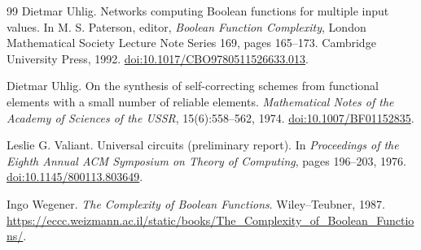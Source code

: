 \documentclass[11pt]{article}
\theoremstyle{definition}
\begin{document}
\begin{thebibliography}{99}
Dietmar Uhlig.
\newblock Networks computing Boolean functions for multiple input values.
\newblock In M. S. Paterson, editor, \emph{Boolean Function Complexity},
London Mathematical Society Lecture Note Series 169, pages 165--173.
Cambridge University Press, 1992.
\newblock \href{https://doi.org/10.1017/CBO9780511526633.013}{doi:10.1017/CBO9780511526633.013}.

Dietmar Uhlig.
\newblock On the synthesis of self-correcting schemes from functional
elements with a small number of reliable elements.
\newblock \emph{Mathematical Notes of the Academy of Sciences of the USSR},
15(6):558--562, 1974.
\newblock \href{https://doi.org/10.1007/BF01152835}{doi:10.1007/BF01152835}.

Leslie G. Valiant.
\newblock Universal circuits (preliminary report).
\newblock In \emph{Proceedings of the Eighth Annual ACM Symposium on Theory
of Computing}, pages 196--203, 1976.
\newblock \href{https://doi.org/10.1145/800113.803649}{doi:10.1145/800113.803649}.

Ingo Wegener.
\newblock \emph{The Complexity of Boolean Functions}.
\newblock Wiley--Teubner, 1987.
\newblock \url{https://eccc.weizmann.ac.il/static/books/The_Complexity_of_Boolean_Functions/}.

\end{thebibliography}
\end{document}
